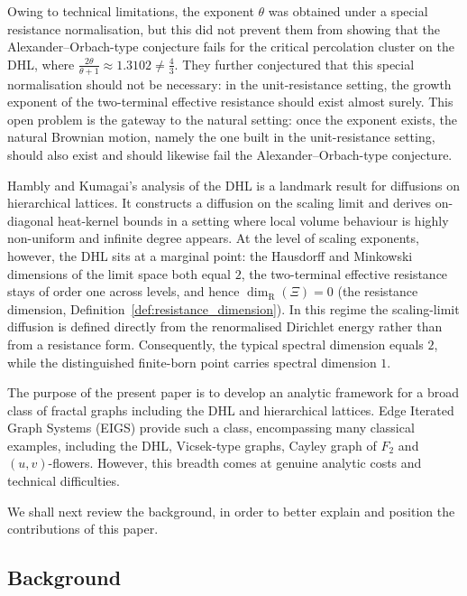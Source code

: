 \documentclass{article}
\theoremstyle{plain}
\theoremstyle{definition}
\newcommand{\dimresis}{\dim_\mathrm{R}}
\begin{document}
Owing to technical limitations, the exponent $\theta$ was obtained under a special resistance normalisation, but this did not prevent them from showing that the Alexander--Orbach-type conjecture fails for the critical percolation cluster on the DHL, where $\frac{2\theta}{\theta+1}\approx 1.3102\neq\frac43$.
They further conjectured that this special normalisation should not be necessary: in the unit-resistance setting, the growth exponent of the two-terminal effective resistance should exist almost surely.
This open problem is the gateway to the natural setting: once the exponent exists, the natural Brownian motion, namely the one built in the unit-resistance setting, should also exist and should likewise fail the Alexander--Orbach-type conjecture.

\bigskip








Hambly and Kumagai's analysis of the DHL is a landmark result for diffusions on hierarchical lattices.
It constructs a diffusion on the scaling limit and derives on-diagonal heat-kernel bounds in a setting where local volume behaviour is highly non-uniform and infinite degree appears.
At the level of scaling exponents, however, the DHL sits at a marginal point:
the Hausdorff and Minkowski dimensions of the limit space both equal $2$, the two-terminal effective resistance stays of order one across levels, and hence $\dimresis(\Xi)=0$ (the resistance dimension, Definition~\ref{def:resistance_dimension}).
In this regime the scaling-limit diffusion is defined directly from the renormalised Dirichlet energy rather than from a resistance form.
Consequently, the typical spectral dimension equals $2$, while the distinguished finite-born point carries spectral dimension $1$.

The purpose of the present paper is to develop an analytic framework for a broad class of fractal graphs including the DHL and hierarchical lattices.
Edge Iterated Graph Systems (EIGS) provide such a class, encompassing many classical examples, including the DHL, Vicsek-type graphs, Cayley graph of $F_2$ and $(u,v)$-flowers.
However, this breadth comes at genuine analytic costs and technical difficulties.

We shall next review the background, in order to better explain and position the contributions of this paper.

\subsection{Background}\label{subsec:background}
\end{document}
